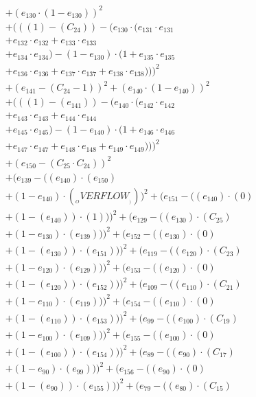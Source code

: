 \documentclass[10pt, a4paper]{article}
\begin{document}
\begin{align*}
& + (e_{130} \cdot (1 - e_{130}))^{2} \\
& + (((1) - (C_{24})) - (e_{130} \cdot (e_{131} \cdot e_{131} \\
& + e_{132} \cdot e_{132} + e_{133} \cdot e_{133} \\
& + e_{134} \cdot e_{134}) - (1 - e_{130}) \cdot (1 + e_{135} \cdot e_{135} \\
& + e_{136} \cdot e_{136} + e_{137} \cdot e_{137} + e_{138} \cdot e_{138})))^{2} \\
& + (e_{141} - (C_{24} - 1))^{2} + (e_{140} \cdot (1 - e_{140}))^{2} \\
& + (((1) - (e_{141})) - (e_{140} \cdot (e_{142} \cdot e_{142} \\
& + e_{143} \cdot e_{143} + e_{144} \cdot e_{144} \\
& + e_{145} \cdot e_{145}) - (1 - e_{140}) \cdot (1 + e_{146} \cdot e_{146} \\
& + e_{147} \cdot e_{147} + e_{148} \cdot e_{148} + e_{149} \cdot e_{149})))^{2} \\
& + (e_{150} - (C_{25}  \cdot  C_{24}))^{2} \\
& + (e_{139} - ((e_{140})  \cdot  (e_{150}) \\
& + (1 - e_{140})  \cdot  (__OVERFLOW__)))^{2} + (e_{151} - ((e_{140}) \cdot (0) \\
& + (1 - (e_{140})) \cdot (1)))^{2} + (e_{129} - ((e_{130})  \cdot  (C_{25}) \\
& + (1 - e_{130})  \cdot  (e_{139})))^{2} + (e_{152} - ((e_{130}) \cdot (0) \\
& + (1 - (e_{130})) \cdot (e_{151})))^{2} + (e_{119} - ((e_{120})  \cdot  (C_{23}) \\
& + (1 - e_{120})  \cdot  (e_{129})))^{2} + (e_{153} - ((e_{120}) \cdot (0) \\
& + (1 - (e_{120})) \cdot (e_{152})))^{2} + (e_{109} - ((e_{110})  \cdot  (C_{21}) \\
& + (1 - e_{110})  \cdot  (e_{119})))^{2} + (e_{154} - ((e_{110}) \cdot (0) \\
& + (1 - (e_{110})) \cdot (e_{153})))^{2} + (e_{99} - ((e_{100})  \cdot  (C_{19}) \\
& + (1 - e_{100})  \cdot  (e_{109})))^{2} + (e_{155} - ((e_{100}) \cdot (0) \\
& + (1 - (e_{100})) \cdot (e_{154})))^{2} + (e_{89} - ((e_{90})  \cdot  (C_{17}) \\
& + (1 - e_{90})  \cdot  (e_{99})))^{2} + (e_{156} - ((e_{90}) \cdot (0) \\
& + (1 - (e_{90})) \cdot (e_{155})))^{2} + (e_{79} - ((e_{80})  \cdot  (C_{15}) \\

\end{align*}
\end{document}
